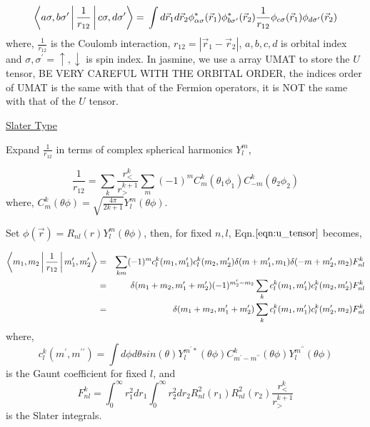 \begin{equation}\label{eqn:u_tensor}
\Braket{a\sigma,b\sigma^{\prime}|\frac{1}{r_{12}}|c\sigma,d\sigma^{\prime}}=\\
\int d\vec{r}_{1}d\vec{r}_{2}\phi_{\alpha\sigma}^{*}(\vec{r}_{1})\phi_{b\sigma^{\prime}}^{*}(\vec{r}_{2})\frac{1}{r_{12}}\phi_{c\sigma}\\
(\vec{r}_{1})\phi_{d\sigma^{\prime}}(\vec{r}_{2})
\end{equation}
where, $\frac{1}{r_{12}}$ is the Coulomb interaction, $r_{12}=|\vec{r}_{1}-\vec{r}_{2}|$, $a,b,c,d$ is orbital index and $\sigma,\sigma^{\prime}=\uparrow,\downarrow$ is spin index. In jasmine, we use a array UMAT to store the $U$ tensor, BE VERY CAREFUL WITH THE ORBITAL ORDER, the indices order of UMAT is the same with that of the Fermion operators, it is NOT the same with that of the $U$ tensor.

\underline{Slater Type}

Expand $\frac{1}{r_{12}}$ in terms of complex spherical harmonics $Y_{l}^{m}$,

\begin{equation}
\frac{1}{r_{12}}=\sum_{k}\frac{r_{<}^{k}}{r_{>}^{k+1}}\sum_{m}(-1)^{m}C_{m}^{k}(\theta_{1}\phi_{1})C_{-m}^{k}(\theta_{2}\phi_{2})
\end{equation}
where, $C_{m}^{k}(\theta\phi)=\sqrt{\frac{4\pi}{2k+1}}Y_{l}^{m}(\theta\phi)$.

Set $\phi(\vec{r})=R_{nl}(r)Y_{l}^{m}(\theta\phi)$, then, for fixed $n,l$, Eqn.$\ref{eqn:u_tensor}$ becomes,

\begin{eqnarray}
\Braket{m_{1},m_{2}|\frac{1}{r_{12}}|m_{1}^{\prime},m_{2}^{\prime}} & = & \sum_{km}(-1)^{m}c_{l}^{k}(m_{1},m_{1}^{\prime})c_{l}^{k}(m_{2},m_{2}^{\prime})\delta(m+m_{1}^{\prime},m_{1})\delta(-m+m_{2}^{\prime},m_{2})F_{nl}^{k}\nonumber \\
 & = & \delta(m_{1}+m_{2},m_{1}^{\prime}+m_{2}^{\prime})(-1)^{m_{2}^{\prime}-m_{2}}\sum_{k}c_{l}^{k}(m_{1},m_{1}^{\prime})c_{l}^{k}(m_{2},m_{2}^{\prime})F_{nl}^{k}\nonumber \\
 & = & \delta(m_{1}+m_{2},m_{1}^{\prime}+m_{2}^{\prime})\sum_{k}c_{l}^{k}(m_{1},m_{1}^{\prime})c_{l}^{k}(m_{2}^{\prime},m_{2})F_{nl}^{k}
\end{eqnarray}
where, 
\begin{equation}
c_{l}^{k}(m^{\prime},m^{\prime\prime})=\int d\phi d\theta sin(\theta)Y_{l}^{m^{\prime}*}(\theta\phi)C_{m^{\prime}-m^{\prime\prime}}^{k}(\theta\phi)Y_{l}^{m^{\prime\prime}}(\theta\phi)
\end{equation}
is the Gaunt coefficient for fixed $l$, and
\begin{equation}
F_{nl}^{k}=\int_{0}^{\infty}r_{1}^{2}dr_{1}\int_{0}^{\infty}r_{2}^{2}dr_{2}R_{nl}^{2}(r_{1})R_{nl}^{2}(r_{2})\frac{r_{<}^{k}}{r_{>}^{k+1}}
\end{equation}
is the Slater integrals.

